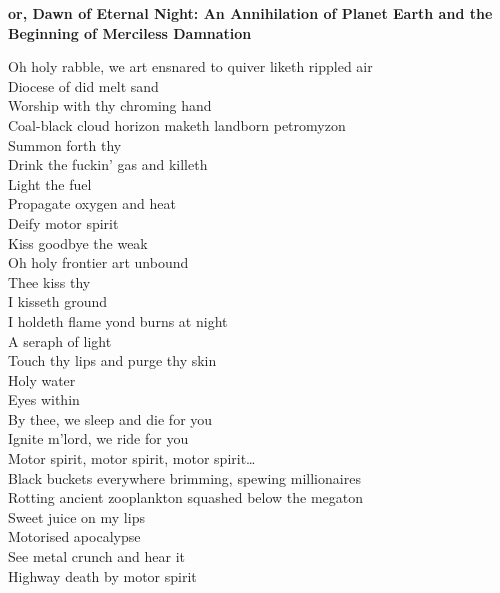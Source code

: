 \vspace*{-.5\baselineskip}%
\textbf{or, Dawn of Eternal Night: An Annihilation of Planet Earth and the Beginning of Merciless Damnation}
\label{album:petrodragonic-apocalypse}



Oh holy rabble, we art ensnared to quiver liketh rippled air \\
Diocese of did melt sand \\
Worship with thy chroming hand \\
Coal-black cloud horizon maketh landborn petromyzon \\
Summon forth thy  \\
Drink the fuckin' gas and killeth \\

Light the fuel \\
Propagate oxygen and heat \\
Deify motor spirit \\
Kiss goodbye the weak \\

Oh holy frontier art unbound \\
Thee kiss thy  \\
I kisseth ground \\
I holdeth flame yond burns at night \\
A seraph of  light \\
Touch thy lips and purge thy skin \\
Holy water \\
Eyes within \\
By thee, we sleep and die for you \\
Ignite m'lord, we ride for you \\

Motor spirit, motor spirit, motor spirit… \\

Black buckets everywhere brimming, spewing millionaires \\
Rotting ancient zooplankton squashed below the megaton \\
Sweet juice on my lips \\
Motorised apocalypse \\
See metal crunch and hear it \\
Highway death by motor spirit \\

